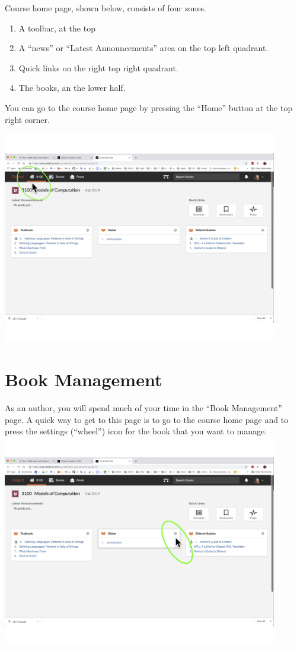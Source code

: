 \begin{gram}
Course home page, shown below, consists of four zones.
\begin{enumerate}
\item A toolbar, at the top
\item A ``news'' or ``Latest Announcements'' area on the top left quadrant.
\item Quick links on the right top right quadrant.
\item The books, an the lower half.
\end{enumerate}

You can go to the course home page by pressing the ``Home'' button at the top right corner.

\includegraphics[width=0.9\textwidth]{lms/media/course-home.jpg}
\end{gram}

\section{Book Management}

\begin{gram}
\label{guide::author::go-book-management}
As an author, you will spend much of your time in the ``Book Management'' page.
A quick way to get to this page is to go to the course home page and to press the settings (``wheel'') icon for the book that you want to manage.
%
\includegraphics[width=0.9\textwidth]{lms/media/go-to-book-management.jpg}
\end{gram}


